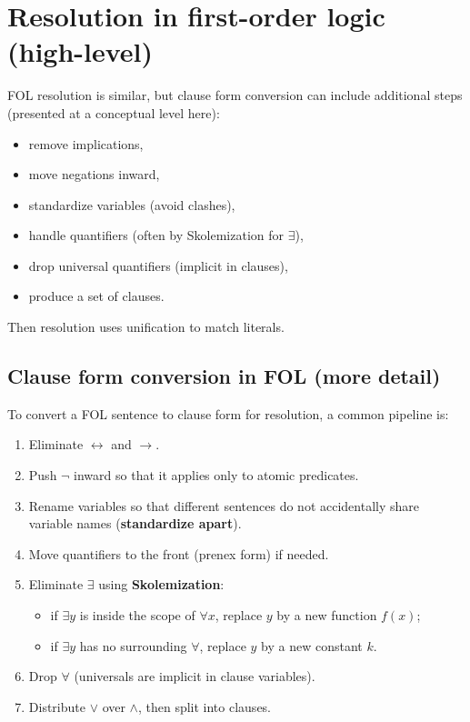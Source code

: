 \documentclass[11pt]{article}
\begin{document}
\section{Resolution in first-order logic (high-level)}
FOL resolution is similar, but clause form conversion can include additional steps (presented at a conceptual level here):
\begin{itemize}[leftmargin=*]
  \item remove implications,
  \item move negations inward,
  \item standardize variables (avoid clashes),
  \item handle quantifiers (often by Skolemization for $\exists$),
  \item drop universal quantifiers (implicit in clauses),
  \item produce a set of clauses.
\end{itemize}
Then resolution uses unification to match literals.

\subsection{Clause form conversion in FOL (more detail)}
To convert a FOL sentence to clause form for resolution, a common pipeline is:
\begin{enumerate}[leftmargin=*]
  \item Eliminate $\leftrightarrow$ and $\rightarrow$.
  \item Push $\lnot$ inward so that it applies only to atomic predicates.
  \item Rename variables so that different sentences do not accidentally share variable names (\textbf{standardize apart}).
  \item Move quantifiers to the front (prenex form) if needed.
  \item Eliminate $\exists$ using \textbf{Skolemization}:
  \begin{itemize}[leftmargin=*]
    \item if $\exists y$ is inside the scope of $\forall x$, replace $y$ by a new function $f(x)$;
    \item if $\exists y$ has no surrounding $\forall$, replace $y$ by a new constant $k$.
  \end{itemize}
  \item Drop $\forall$ (universals are implicit in clause variables).
  \item Distribute $\lor$ over $\land$, then split into clauses.
\end{enumerate}
\end{document}
